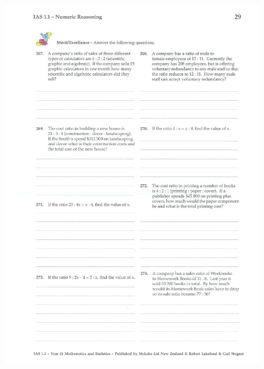 \documentclass[a4paper,12pt]{article}
\begin{document}
\begin{figure}[!h]
	\centering
	\includegraphics[width=17cm]{Nulake_year10_forextension_ratio5}
\end{figure}
\end{document}
